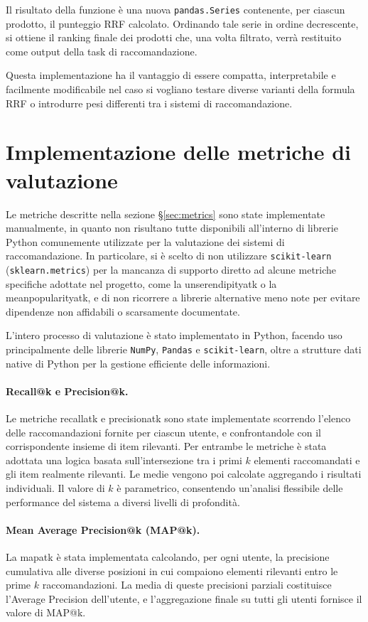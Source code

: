 Il risultato della funzione è una nuova \texttt{pandas.Series} contenente, per ciascun prodotto, il punteggio RRF calcolato. Ordinando tale serie in ordine decrescente, si ottiene il ranking finale dei prodotti che, una volta filtrato, verrà restituito come output della task di raccomandazione.

Questa implementazione ha il vantaggio di essere compatta, interpretabile e facilmente modificabile nel caso si vogliano testare diverse varianti della formula RRF o introdurre pesi differenti tra i sistemi di raccomandazione.


\section{Implementazione delle metriche di valutazione}

Le metriche descritte nella sezione \S\ref{sec:metrics} sono state implementate manualmente, in quanto non risultano tutte disponibili all'interno di librerie Python comunemente utilizzate per la valutazione dei sistemi di raccomandazione. In particolare, si è scelto di non utilizzare \texttt{scikit-learn} (\texttt{sklearn.metrics}) per la mancanza di supporto diretto ad alcune metriche specifiche adottate nel progetto, come la \gls{unserendipityatk} o la \gls{meanpopularityatk}, e di non ricorrere a librerie alternative meno note per evitare dipendenze non affidabili o scarsamente documentate.

L’intero processo di valutazione è stato implementato in Python, facendo uso principalmente delle librerie \texttt{NumPy}, \texttt{Pandas} e \texttt{scikit-learn}, oltre a strutture dati native di Python per la gestione efficiente delle informazioni.

\paragraph{Recall@k e Precision@k.}
Le metriche \gls{recallatk} e \gls{precisionatk} sono state implementate scorrendo l’elenco delle raccomandazioni fornite per ciascun utente, e confrontandole con il corrispondente insieme di item rilevanti. Per entrambe le metriche è stata adottata una logica basata sull’intersezione tra i primi $k$ elementi raccomandati e gli item realmente rilevanti. Le medie vengono poi calcolate aggregando i risultati individuali. Il valore di $k$ è parametrico, consentendo un'analisi flessibile delle performance del sistema a diversi livelli di profondità.

\paragraph{Mean Average Precision@k (MAP@k).}
La \gls{mapatk} è stata implementata calcolando, per ogni utente, la precisione cumulativa alle diverse posizioni in cui compaiono elementi rilevanti entro le prime $k$ raccomandazioni. La media di queste precisioni parziali costituisce l'Average Precision dell’utente, e l’aggregazione finale su tutti gli utenti fornisce il valore di MAP@k.

